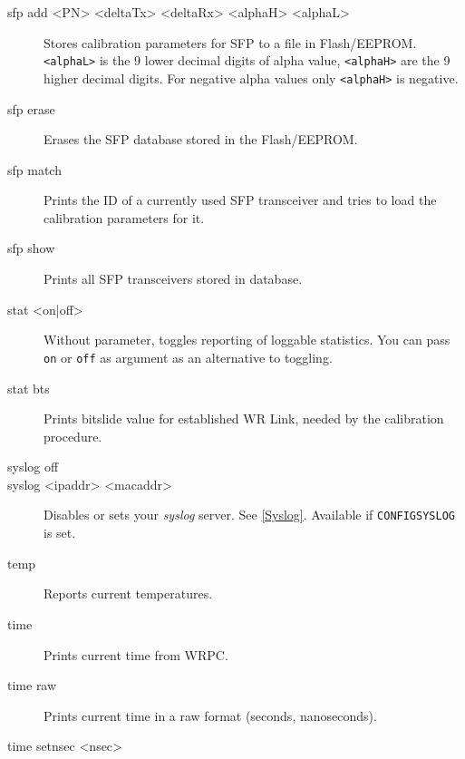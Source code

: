 \documentclass[a4paper, 12pt]{article}
\renewcommand{\_}{\underscore\allowbreak}
\newcommand{\code}[1]{\texttt{#1}}
\begin{document}
\begin{description}
\item[sfp add <PN> <deltaTx> <deltaRx> <alphaH> <alphaL>] \mbox{}

  Stores calibration parameters for SFP to a file in
  Flash/EEPROM. \code{<alphaL>} is the 9 lower decimal digits of alpha
  value, \code{<alphaH>} are the 9 higher decimal digits. For negative
  alpha values only \code{<alphaH>} is negative.

\item[sfp erase] \mbox{}

  Erases the SFP database stored in the Flash/EEPROM.

\item[sfp match] \mbox{}

  Prints the ID of a currently used SFP transceiver and tries to load
  the calibration parameters for it.

\item[sfp show] \mbox{}

  Prints all SFP transceivers stored in database.

\item[stat <on|off>] \mbox{}

  Without parameter, toggles reporting of loggable statistics. You can
  pass \texttt{on} or \texttt{off} as argument as an alternative to
  toggling.

\item[stat bts] \mbox{}

  Prints bitslide value for established WR Link, needed by the
  calibration procedure.

\item[syslog off]

\item[syslog <ipaddr> <macaddr>] \mbox{}

  Disables or sets your \textit{syslog} server. See
  \ref{Syslog}. Available if \texttt{CONFIG\_SYSLOG} is set.

\item[temp] \mbox{}

  Reports current temperatures.

\item[time] \mbox{}

  Prints current time from WRPC.

\item[time raw] \mbox{}

  Prints current time in a raw format (seconds, nanoseconds).

\item[time setnsec <nsec>] \mbox{}


\end{description}
\end{document}

